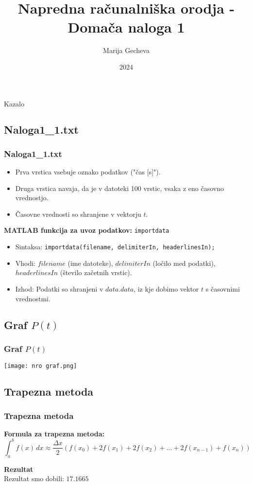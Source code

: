 \documentclass{beamer}
\title{Napredna računalniška orodja - Domača naloga 1}
\author{Marija Gecheva}
\date{2024}
\begin{document}
\begin{frame}
    \titlepage
\end{frame}

\begin{frame}{Kazalo}
    \tableofcontents
\end{frame}


\begin{frame}
\section{Naloga1\_1.txt}
\frametitle{Naloga1\_1.txt}
    \begin{itemize}
        \item Prva vrstica vsebuje oznako podatkov ("čas [s]").
        \item Druga vrstica navaja, da je v datoteki 100 vrstic, vsaka z eno časovno vrednostjo.
        \item Časovne vrednosti so shranjene v vektorju $t$.
    \end{itemize}
    \vspace{0.5cm}
    \textbf{MATLAB funkcija za uvoz podatkov:} \texttt{importdata} \\
    \begin{itemize}
        \item Sintaksa: \texttt{importdata(filename, delimiterIn, headerlinesIn);}
        \item Vhodi: $filename$ (ime datoteke), $delimiterIn$ (ločilo med podatki), $headerlinesIn$ (število začetnih vrstic).
        \item Izhod: Podatki so shranjeni v $data.data$, iz kje dobimo vektor $t$ s časovnimi vrednostmi.
\end{itemize}
\end{frame}


\begin{frame}
\section{Graf $P(t)$}
\frametitle{Graf $P(t)$}
    \texttt{[image: nro graf.png]}
    \centering
\end{frame}


\begin{frame}
\section{Trapezna metoda}
\frametitle{Trapezna metoda}
    \textbf{Formula za trapezna metoda:}
    \[
    \int_{a}^{b} f(x) \, dx \approx \frac{\Delta x}{2} \left( f(x_0) + 2f(x_1) + 2f(x_2) + \dots + 2f(x_{n-1}) + f(x_n) \right)
    \]
    
    \vspace{0.5cm}
    \textbf{Rezultat} \\
    Rezultat smo dobili: $17.1665$
\end{frame}
\end{document}
